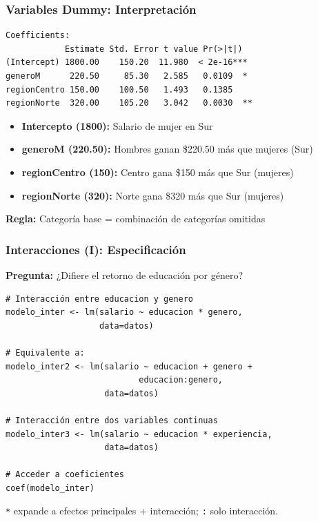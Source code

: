 \documentclass[aspectratio=169,11pt]{beamer}
\begin{document}
\begin{frame}[fragile]
  \frametitle{Variables Dummy: Interpretación}

  \tiny
  \begin{lstlisting}
Coefficients:
            Estimate Std. Error t value Pr(>|t|)
(Intercept) 1800.00    150.20  11.980  < 2e-16***
generoM      220.50     85.30   2.585   0.0109  *
regionCentro 150.00    100.50   1.493   0.1385
regionNorte  320.00    105.20   3.042   0.0030  **
  \end{lstlisting}

  \small
  \begin{itemize}
    \item \textbf{Intercepto (1800):} Salario de mujer en Sur
    \item \textbf{generoM (220.50):} Hombres ganan \$220.50 más que mujeres (Sur)
    \item \textbf{regionCentro (150):} Centro gana \$150 más que Sur (mujeres)
    \item \textbf{regionNorte (320):} Norte gana \$320 más que Sur (mujeres)
  \end{itemize}

  \vspace{0.2cm}
  \textbf{Regla:} Categoría base = combinación de categorías omitidas
\end{frame}

\begin{frame}[fragile]
  \frametitle{Interacciones (I): Especificación}

  \textbf{Pregunta:} ¿Difiere el retorno de educación por género?

  \begin{lstlisting}
# Interacción entre educacion y genero
modelo_inter <- lm(salario ~ educacion * genero,
                   data=datos)

# Equivalente a:
modelo_inter2 <- lm(salario ~ educacion + genero +
                           educacion:genero,
                    data=datos)

# Interacción entre dos variables continuas
modelo_inter3 <- lm(salario ~ educacion * experiencia,
                    data=datos)

# Acceder a coeficientes
coef(modelo_inter)
  \end{lstlisting}

  \small
  \texttt{*} expande a efectos principales + interacción; \texttt{:} solo interacción.
\end{frame}
\end{document}
